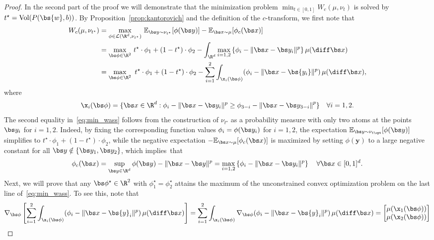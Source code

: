 \documentclass[11pt, a4paper, oneside, reqno]{article}
\begin{document}
\begin{proof}
		
		In the second part of the proof we will demonstrate that the minimization problem $\min_{t\in[0,1]} W_c(\mu, \nu_ t )$ is solved by $t^\star=\textrm{Vol}(P(\bs{w}, b))$. By Proposition~\ref{prop:kantorovich} and the definition of the $c$-transform, we first note that
		\begin{align}
		W_c(\mu, \nu_ {t^\star} ) 
		&=\underset{\phi \in \mathcal{L}(\R^d, \nu_{t^\star})}{\max} ~ \mathbb{E}_{\bs y\sim \nu_{t^\star}}[\phi(\bs y)] - \mathbb{E}_{\bs x\sim\mu}[\phi_c(\bs x)] \nonumber \\
		\label{eq:min_wass}
		&= \underset{\bs \phi \in \R^2}{\max} ~ t^\star \cdot \phi_1   + (1- t^\star ) \cdot\phi_2- \int_{\R^d}\max_{i=1,2}\left\{\phi_i- \|\bs x-\bs y_i \|^p\right\}\mu(\diff \bs x)\\
		&= \max\limits_{\bs \phi \in \R^2} ~ t^\star \cdot \phi_1   + (1-t^\star)\cdot \phi_2- \sum\limits_{i = 1}^2 \int_{\x_i(\bs \phi)}(\phi_i - \|\bs x - \bs {y_i}\|^p)\,\mu(\diff \bs x), \nonumber
		\end{align}
		where 
		\[
		\x_i(\bs \phi) = \{\bs x\in\R^d: \phi_i - \|\bs x-\bs y_i \|^p \geq  \phi_{3-i} - \left \|\bs x - \bs y_{3-i} \right\|^p\}\quad \forall i=1,2.
		\] 
		The second equality in~\eqref{eq:min_wass} follows from the construction of $\nu_{t^\star}$ as a probability measure with only two atoms at the points $\bs y_i$ for $i=1,2$. Indeed, by fixing the corresponding function values $\phi_i=\phi(\bs y_i)$ for $i=1,2$, the expectation $\mathbb{E}_{\bs y \sim \nu_{t\opt}}[\phi(\bs y)]$ simplifies to $t^\star \cdot \phi_1   + (1-t^\star)\cdot \phi_2$, while the negative expectation $-\mathbb{E}_{\bs x \sim \mu}[\phi_c(\bs x)]$ is maximized by setting $\phi(\bm y)$ to a large negative constant for all $\bs y\notin\{\bs y_1,\bs y_2\}$, which implies~that
		\[
		\phi_c(\bs x) = \sup_{\bs y \in \R^d} \phi(\bs y) - \|\bs x - \bs y\|^p = \max_{i=1,2}\left\{\phi_i- \|\bs x-\bs y_i \|^p\right\} \quad \forall \bs x\in [0,1]^d.
		\]
		Next, we will prove that any $\bs \phi^\star\in\R^2$ with $\phi^\star_1=\phi^\star_2$ attains the maximum of the unconstrained convex optimization problem on the last line of~\eqref{eq:min_wass}. To see this, note that
		\[
		\nabla_{\bs \phi} \left[\sum\limits_{i = 1}^2 \int_{\x_i(\bs \phi)}(\phi_i - \|\bs x - \bs {y}_i\|^p)\,\mu(\diff \bs x)\right] = \sum\limits_{i = 1}^2 \int_{\x_i(\bs \phi)} \nabla_{\bs \phi}(\phi_i - \|\bs x - \bs {y}_i\|^p)\,\mu(\diff \bs x) =\begin{bmatrix} \mu(\x_1(\bs \phi))\\ \mu(\x_2(\bs \phi)) \end{bmatrix}
\]
\end{proof}
\end{document}
